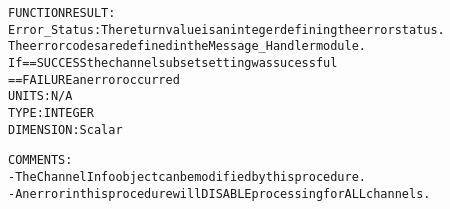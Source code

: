 \begin{alltt}
  FUNCTION RESULT:
        Error_Status:   The return value is an integer defining the error status.
                        The error codes are defined in the Message_Handler module.
                        If == SUCCESS the channel subset setting was sucessful
                           == FAILURE an error occurred
                        UNITS:      N/A
                        TYPE:       INTEGER
                        DIMENSION:  Scalar
 
  COMMENTS:
        - The ChannelInfo object can be modified by this procedure.
        - An error in this procedure will DISABLE processing for ALL channels.
 
  \end{alltt}
